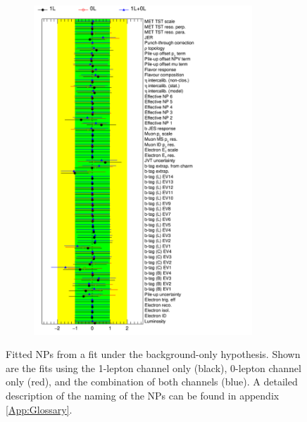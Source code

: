 \begin{figure}[htb!]
\begin{subfigure}{0.5\textwidth}
  \centering
  \includegraphics[width=0.9\textwidth]{figures/VLQ/NuisPar_comp_Detectoruncertainties_Data.png}
  \caption*{}
  \label{}
\end{subfigure}
\captionsetup{width=0.85\textwidth} \caption{\small Fitted NPs from a fit under the background-only hypothesis.   Shown are the fits using the 1-lepton channel only (black), 0-lepton channel only (red), and the combination of both channels (blue). A detailed description of the naming of the NPs can be found in appendix \ref{App:Glossary}.}
\label{sec:vlq:fig:datafit}
\end{figure}

